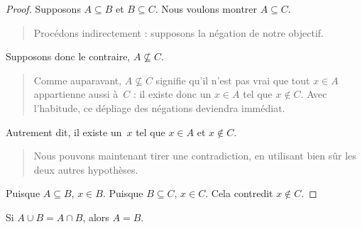 \documentclass[../../../include/open-logic-section]{subfiles}
\begin{document}
\begin{proof}
  Supposons $A \subseteq B$
  et $B \subseteq C$. Nous
  voulons montrer
  $A \subseteq C$.
  \begin{quote}
    Procédons indirectement :
    supposons la négation
    de notre objectif.
  \end{quote}
  Supposons donc le contraire,
  $A \nsubseteq C$.
  \begin{quote}
    Comme auparavant,
    $A \nsubseteq C$ signifie
    qu'il n'est pas vrai
    que tout $x \in A$
    appartienne aussi à~$C$ :
    il existe donc un
    $x \in A$ tel que
    $x \notin C$. Avec
    l'habitude, ce dépliage
    des négations deviendra
    immédiat.
  \end{quote}
  Autrement dit, il existe
  un~$x$ tel que
  $x \in A$ et
  $x \notin C$.
  \begin{quote}
    Nous pouvons maintenant
    tirer une contradiction,
    en utilisant bien sûr
    les deux autres hypothèses.
  \end{quote}
  Puisque $A \subseteq B$,
  $x \in B$. Puisque
  $B \subseteq C$,
  $x \in C$. Cela
  contredit $x \notin C$.
\end{proof}

\begin{prop}
Si $A \cup B = A \cap B$,
alors $A = B$.
\end{prop}
\end{document}
